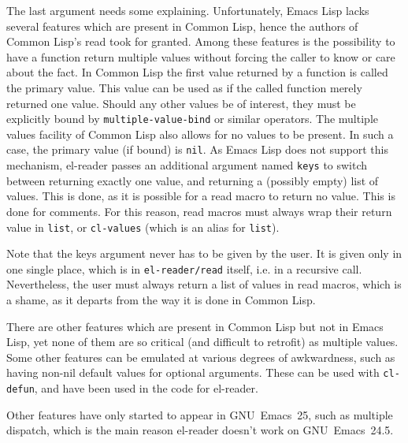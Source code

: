 \documentclass[a4paper,10pt,twoside]{article}
\newcommand{\el}{Emacs Lisp}
\newcommand{\cl}{Common Lisp}
\newcommand{\elr}{el-reader}
\newcommand{\sym}[1]{\texttt{#1}}
\newcommand{\fun}[1]{\texttt{#1}}
\newcommand{\emacsv}[1]{GNU~Emacs~#1}
\begin{document}
The last argument needs some explaining.  Unfortunately, \el{} lacks several
features which are present in \cl{}, hence the authors of \cl{}’s read took for
granted.  Among these features is the possibility to have a function return
multiple values without forcing the caller to know or care about the fact.  In
\cl{} the first value returned by a function is called the primary value.  This
value can be used as if the called function merely returned one value.  Should
any other values be of interest, they must be explicitly bound by
\sym{multiple-value-bind} or similar operators.  The multiple values facility of
\cl{} also allows for no values to be present.  In such a case, the primary
value (if bound) is \sym{nil}.  As \el{} does not support this mechanism, \elr{}
passes an additional argument named \sym{keys} to switch between returning
exactly one value, and returning a (possibly empty) list of values.  This is
done, as it is possible for a read macro to return no value.  This is done for
comments.  For this reason, read macros must always wrap their return value in
\fun{list}, or \fun{cl-values} (which is an alias for \fun{list}).

Note that the keys argument never has to be given by the user.  It is given only
in one single place, which is in \fun{el-reader/read} itself, i.e. in a
recursive call.  Nevertheless, the user must always return a list of values in
read macros, which is a shame, as it departs from the way it is done in \cl{}.

There are other features which are present in \cl{} but not in \el{}, yet none
of them are so critical (and difficult to retrofit) as multiple values.  Some
other features can be emulated at various degrees of awkwardness, such as having
non-nil default values for optional arguments.  These can be used with
\fun{cl-defun}, and have been used in the code for \elr{}.

Other features have only started to appear in \emacsv{25}, such as multiple
dispatch, which is the main reason \elr{} doesn’t work on \emacsv{24.5}.

\end{document}
